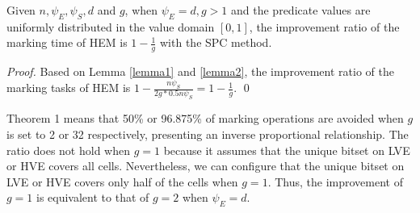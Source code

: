 \documentclass[runningheads]{llncs}
\begin{document}
\begin{theorem}
\label{theorem1}
Given $n,\psi_E,\psi_S, d$ and $g$, when $\psi_E=d,g>1$ and the predicate values are uniformly distributed in the value domain $[0,1]$, the improvement ratio of the marking time of HEM is $1-\frac{1}{g}$ with the SPC method.
\end{theorem}
\begin{proof}
Based on Lemma \ref{lemma1} and \ref{lemma2}, the improvement ratio of the marking tasks of HEM is $1 - \frac{n\psi_S}{2g*0.5n\psi_S} =1-\frac{1}{g}$. \qed
\end{proof}

Theorem 1 means that 50\% or 96.875\% of marking operations are avoided when $g$ is set to 2 or 32 respectively, presenting an inverse proportional relationship. The ratio does not hold when $g=1$ because it assumes that the unique bitset on LVE or HVE covers all cells. Nevertheless, we can configure that the unique bitset on LVE or HVE covers only half of the cells when $g=1$. Thus, the improvement of $g=1$ is equivalent to that of $g=2$ when $\psi_E=d$. 

\label{qip}






\end{document}
